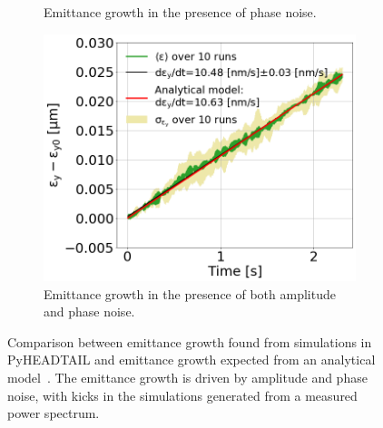 \begin{figure}[!ht]
\begin{subfigure}[t]{0.45 \textwidth}
         \caption{Emittance growth in the presence of phase noise.}
         \label{fig:emitGrowth_PN}
     \end{subfigure}
     \hfill
     \begin{subfigure}[t]{0.45\textwidth}
         \centering
         \includegraphics[width=1\textwidth]{./images/app_B/emitGrowth_eyEvolution_sps_270GeV_WakesOFF_ayy1500_QpxQpy1_Nb5e5_IPACvalues_coast1_setting2_AN_PN.png}
        \caption{Emittance growth in the presence of both amplitude and phase noise.}
         \label{fig:emitGrowth_AN_and_PN}
     \end{subfigure}
     \hfill
     \caption{Comparison between emittance growth found from simulations in PyHEADTAIL and emittance growth expected from an analytical model~\cite{PhysRevSTAB.18.101001}.  The emittance growth is driven by amplitude and phase noise, with kicks in the simulations generated from a measured power spectrum.}
     \label{fig:emitGrowth_AN_PN_example}
\end{figure}
